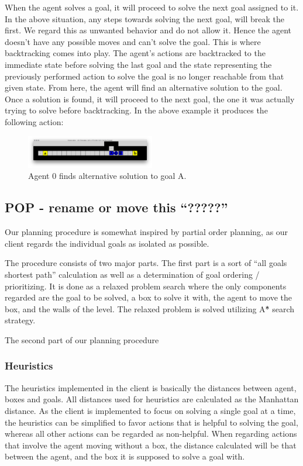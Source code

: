 \documentclass[Main]{subfiles}
\begin{document}
When the agent solves a goal, it will proceed to solve the next goal assigned to it. In the above situation, any steps towards solving the next goal, will break the first. We regard this as unwanted behavior and do not allow it. Hence the agent doesn't have any possible moves and can't solve the goal. This is where backtracking comes into play. The agent's actions are backtracked to the immediate state before solving the last goal and the state representing the previously performed action to solve the goal is no longer reachable from that given state. From here, the agent will find an alternative solution to the goal. Once a solution is found, it will proceed to the next goal, the one it was actually trying to solve before backtracking. In the above example it produces the following action:
\begin{figure}[h!]
    \centering
    \includegraphics[width=0.5\textwidth]{backtrack2.png}
    \caption{Agent 0 finds alternative solution to goal A.}
    \label{fig:backtrack2}
\end{figure}





\subsection{POP - rename or move this ``?????'' }

Our planning procedure is somewhat inspired by partial order planning, as our client regards the individual goals as isolated as possible. 

The procedure consists of two major parts. The first part is a sort of ``all goals shortest path'' calculation as well as a determination of goal ordering / prioritizing. 
It is done as a relaxed problem search where the only components regarded are the goal to be solved, a box to solve it with, the agent to move the box, and the walls of the level. The relaxed problem is solved utilizing A\^{*} search strategy. 

The second part of our planning procedure  




\subsubsection{Heuristics}
\label{sec:method_heuristics}
The heuristics implemented in the client is basically the distances between agent, boxes and goals. All distances used for heuristics are calculated as the Manhattan distance.  As the client is implemented to focus on solving a single goal at a time, the heuristics can be simplified to favor actions that is helpful to solving the goal, whereas all other actions can be regarded as non-helpful. 
When regarding actions that involve the agent moving without a box, the distance calculated will be that between the agent, and the box it is supposed to solve a goal with. 
\end{document}
